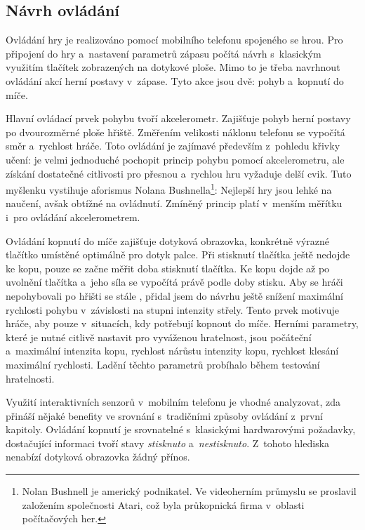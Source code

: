 \documentclass[thesis=B,czech,hidelinks]{FITthesis}[2012/06/26] %
\begin{document}
\subsection{Návrh ovládání}

Ovládání hry je realizováno pomocí mobilního telefonu spojeného se hrou. Pro připojení do hry a~nastavení parametrů zápasu počítá návrh s~klasickým využitím tlačítek zobrazených na dotykové ploše. Mimo to je třeba navrhnout ovládání akcí herní postavy v~zápase. Tyto akce jsou dvě: pohyb a~kopnutí do míče.

Hlavní ovládací prvek pohybu tvoří akcelerometr. Zajišťuje pohyb herní postavy po dvourozměrné ploše hřiště. Změřením velikosti náklonu telefonu se vypočítá směr a~rychlost hráče. Toto ovládání je zajímavé především z~pohledu křivky učení: je velmi jednoduché pochopit princip pohybu pomocí akcelerometru, ale získání dostatečné citlivosti pro přesnou a~rychlou hru vyžaduje delší cvik. Tuto myšlenku vystihuje aforismus Nolana Bushnella\footnote{Nolan Bushnell je americký podnikatel. Ve videoherním průmyslu se proslavil založením společnosti Atari, což byla průkopnická firma v~oblasti počítačových her.\cite{atari}}: Nejlepší hry jsou lehké na naučení, avšak obtížné na ovládnutí. \cite{atari} Zmíněný princip platí v~menším měřítku i~pro ovládání akcelerometrem.

Ovládání kopnutí do míče zajišťuje dotyková obrazovka, konkrétně výrazné tlačítko umístěné optimálně pro dotyk palce. Při stisknutí tlačítka ještě nedojde ke kopu, pouze se začne měřit doba stisknutí tlačítka. Ke kopu dojde až po uvolnění tlačítka a~jeho síla se vypočítá právě podle doby stisku. Aby se hráči nepohybovali po hřišti se stále , přidal jsem do návrhu ještě snížení maximální rychlosti pohybu v~závislosti na stupni intenzity střely. Tento prvek motivuje hráče, aby  pouze v~situacích, kdy potřebují kopnout do míče. Herními parametry, které je nutné citlivě nastavit pro vyváženou hratelnost, jsou počáteční a~maximální intenzita kopu, rychlost nárůstu intenzity kopu, rychlost klesání maximální rychlosti. Ladění těchto parametrů probíhalo během testování hratelnosti.

Využití interaktivních senzorů v~mobilním telefonu je vhodné analyzovat, zda přináší nějaké benefity ve srovnání s~tradičními způsoby ovládání z~první kapitoly. Ovládání kopnutí je srovnatelné s~klasickými hardwarovými požadavky, dostačující informaci tvoří stavy \textit{stisknuto} a~\textit{nestisknuto}. Z~tohoto hlediska nenabízí dotyková obrazovka žádný přínos.
\end{document}

